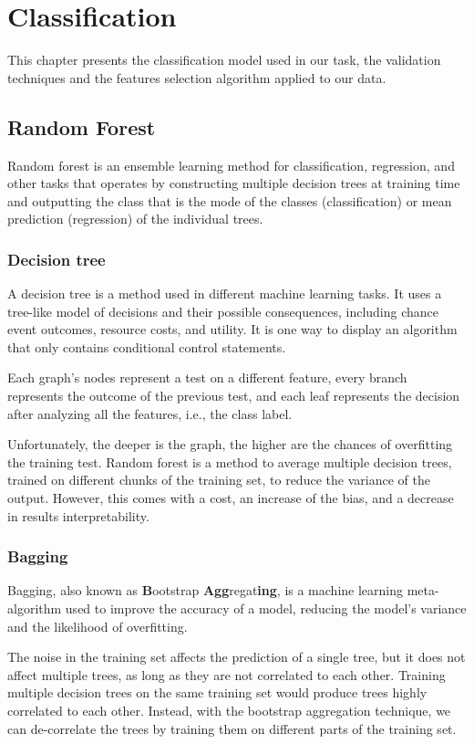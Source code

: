 \chapter{Classification}
\label{ch:classif}
This chapter presents the classification model used in our task, the validation techniques and the features selection algorithm applied to our data.
\section{Random Forest}
Random forest is an ensemble learning method for classification, regression, and other tasks that operates by constructing multiple decision trees at training time and outputting the class that is the mode of the classes (classification) or mean prediction (regression) of the individual trees. \cite{ho1995random}
\subsection{Decision tree}
A decision tree is a method used in different machine learning tasks. It uses a tree-like model of decisions and their possible consequences, including chance event outcomes, resource costs, and utility. It is one way to display an algorithm that only contains conditional control statements. \cite{kaminski2018framework}

Each graph's nodes represent a test on a different feature, every branch represents the outcome of the previous test, and each leaf represents the decision after analyzing all the features, i.e., the class label. 

Unfortunately, the deeper is the graph, the higher are the chances of overfitting the training test.
Random forest is a method to average multiple decision trees, trained on different chunks of the training set, to reduce the variance of the output. However, this comes with a cost, an increase of the bias, and a decrease in results interpretability. \cite{hastie2009elements}
\subsection{Bagging}

Bagging, also known as \textbf{B}ootstrap \textbf{Agg}regat\textbf{ing}, is a machine learning meta-algorithm used to improve the accuracy of a model, reducing the model's variance and the likelihood of overfitting. 

The noise in the training set affects the prediction of a single tree, but it does not affect multiple trees, as long as they are not correlated to each other. Training multiple decision trees on the same training set would produce trees highly correlated to each other. Instead, with the bootstrap aggregation technique, we can de-correlate the trees by training them on different parts of the training set. \cite{breiman1996bagging}

